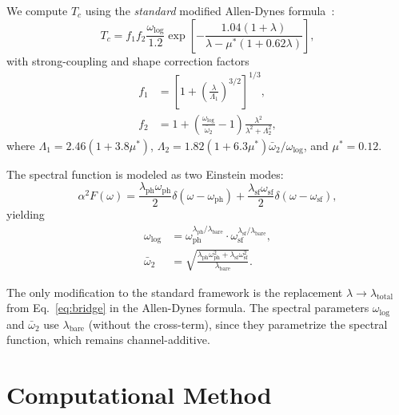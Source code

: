\documentclass[twocolumn,showpacs,preprintnumbers,amsmath,amssymb,prb]{revtex4-2}
\begin{document}
We compute $T_c$ using the \textit{standard} modified Allen-Dynes formula~\cite{AllenDynes1975}:
\begin{equation}
T_c = f_1 f_2 \frac{\omega_{\log}}{1.2} \exp\!\left[ -\frac{1.04(1+\lambda)}{\lambda - \mu^*(1+0.62\lambda)} \right],
\end{equation}
with strong-coupling and shape correction factors
\begin{align}
f_1 &= \left[ 1 + \left(\frac{\lambda}{\Lambda_1}\right)^{3/2} \right]^{1/3}, \\
f_2 &= 1 + \left(\frac{\omega_{\log}}{\bar{\omega}_2} - 1\right) \frac{\lambda^2}{\lambda^2 + \Lambda_2^2},
\end{align}
where $\Lambda_1 = 2.46(1+3.8\mu^*)$, $\Lambda_2 = 1.82(1+6.3\mu^*)\bar{\omega}_2/\omega_{\log}$, and $\mu^* = 0.12$.

The spectral function is modeled as two Einstein modes:
\begin{equation}
\alpha^2 F(\omega) = \frac{\lambda_{\mathrm{ph}} \omega_{\mathrm{ph}}}{2} \delta(\omega - \omega_{\mathrm{ph}}) + \frac{\lambda_{\mathrm{sf}} \omega_{\mathrm{sf}}}{2} \delta(\omega - \omega_{\mathrm{sf}}),
\end{equation}
yielding
\begin{align}
\omega_{\log} &= \omega_{\mathrm{ph}}^{\lambda_{\mathrm{ph}}/\lambda_{\mathrm{bare}}} \cdot \omega_{\mathrm{sf}}^{\lambda_{\mathrm{sf}}/\lambda_{\mathrm{bare}}}, \\
\bar{\omega}_2 &= \sqrt{\frac{\lambda_{\mathrm{ph}} \omega_{\mathrm{ph}}^2 + \lambda_{\mathrm{sf}} \omega_{\mathrm{sf}}^2}{\lambda_{\mathrm{bare}}}}.
\end{align}

The only modification to the standard framework is the replacement $\lambda \to \lambda_{\mathrm{total}}$ from Eq.~\eqref{eq:bridge} in the Allen-Dynes formula.
The spectral parameters $\omega_{\log}$ and $\bar{\omega}_2$ use $\lambda_{\mathrm{bare}}$ (without the cross-term), since they parametrize the spectral function, which remains channel-additive.

\section{Computational Method}
\end{document}
